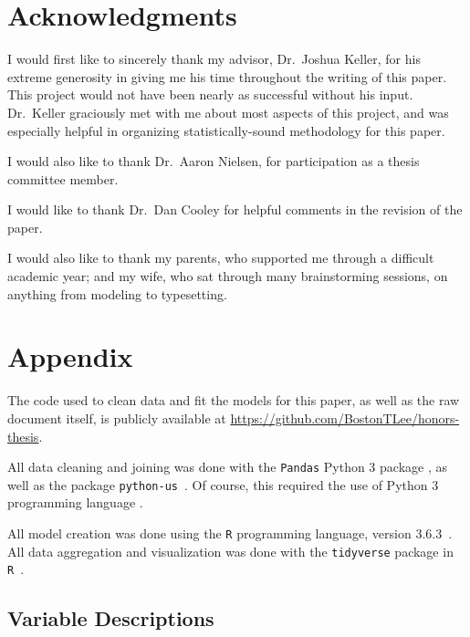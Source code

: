 \documentclass{article}
\begin{document}
\section{Acknowledgments}

I would first like to sincerely thank my advisor,
Dr.\ Joshua Keller, for his extreme generosity in giving
me his time throughout the writing of this paper.
This project would not have been nearly as successful
without his input.
Dr.\ Keller graciously met with me about most
aspects of this project, and was especially
helpful in organizing statistically-sound
methodology for this paper.

I would also like to thank Dr.\ Aaron Nielsen,
for participation as a thesis committee member.

I would like to thank Dr.\ Dan Cooley for
helpful comments in the revision of the paper.

I would also like to thank my parents, who supported
me through a difficult academic year; and my wife,
who sat through many brainstorming sessions,
on anything from modeling to typesetting.

\pagebreak

\section{Appendix}

The code used to clean data and fit the models for this
paper, as well as the raw document itself,
is publicly available at
\url{https://github.com/BostonTLee/honors-thesis}.

All data cleaning and joining was done with the \texttt{Pandas} Python 3 package
\cite{python_pandas}, as well as the package \texttt{python-us}~\cite{python_us}.
Of course, this required the use of Python 3 programming language
\cite{python_lang}.

All model creation was done using the \texttt{R} programming
language, version 3.6.3~\cite{r_lang}.
All data aggregation and visualization was done with the
\texttt{tidyverse} package in \texttt{R}~\cite{r_tidyverse}.

\subsection{Variable Descriptions}\label{sec:variables}
\end{document}
